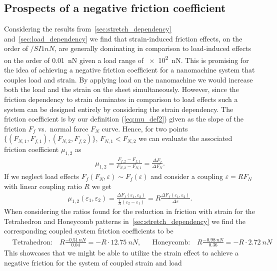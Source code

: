 \subsection{Prospects of a negative friction coefficient}\label{sec:neg_prospects}
Considering the results from~\cref{sec:stretch_dependency} and~\cref{sec:load_dependency} we find that strain-induced friction effects, on the order of $/SI{1}{nN}$, are generally dominating in comparison to load-induced effects on the order of \SI{0.01}{nN} given a load range of \SI{e2}{nN}. This is promising for the idea of achieving a negative friction coefficient for a nanomachine system that couples load and strain. By applying load on the nanomachine we would increase both the load and the strain on the sheet simultaneously. However, since the friction dependency to strain dominates in comparison to load effects such a system can be designed entirely by considering the strain dependency. The friction coefficient is by our definition (\cref{eq:mu_def2}) given as the slope of the friction $F_f$ vs.\ normal force $F_N$ curve. Hence, for two points $\{(F_{N,1}, F_{f,1}), (F_{N,2}, F_{f,2})\}$, $F_{N,1} < F_{N,2}$ we can evaluate the associated friction coefficient $\mu_{1,2}$ as 
\begin{align*}
  \mu_{1,2} = \frac{F_{f,2} - F_{f,1}}{F_{N,2} - F_{N,1}} = \frac{\Delta F_f}{\Delta F_N}.
\end{align*}
If we neglect load effects $F_f(F_N, \varepsilon) \sim F_f(\varepsilon)$ and consider a coupling $\varepsilon = R F_N$ with linear coupling ratio $R$ we get 
\begin{align}
  \mu_{1,2}(\varepsilon_1, \varepsilon_2) = \frac{\Delta F_{f}(\varepsilon_1, \varepsilon_2)}{\frac{1}{R}(\varepsilon_2 - \varepsilon_1)} = R\frac{\Delta F_{f}(\varepsilon_1, \varepsilon_2)}{\Delta \varepsilon}.
  \label{eq:mu_strain}
\end{align}
When considering the ratios found for the reduction in friction with strain for the Tetrahedron and Honeycomb patterns in~\cref{sec:stretch_dependency} we find the corresponding coupled system friction coefficients to be 
\begin{align}
  &\text{Tetrahedron:} \quad R\frac{-\SI{0.51}{nN}}{0.04} = -R\cdot\SI{12.75}{nN},& &\text{Honeycomb:} \quad R\frac{-\SI{0.98}{nN}}{0.36} = -R\cdot\SI{2.72}{nN}&
  \label{eq:pilot_study_mu_estimate}
\end{align}
This showcases that we might be able to utilize the strain effect to achieve a negative friction for the system of coupled strain and load







